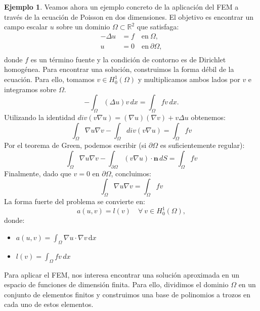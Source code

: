 \documentclass[a4paper,11pt,spanish, twoside, leqno]{tfg-uam}
\theoremstyle{definition}
\newtheorem{exmp}[teor]{Ejemplo}
\begin{document}
\begin{mdframed}  
\begin{exmp}
    Veamos ahora un ejemplo concreto de la aplicación del FEM a través de la ecuación de Poisson en dos dimensiones. El objetivo es encontrar un campo escalar $ u $ sobre un dominio $\Omega \subset \mathbb{R}^2$ que satisfaga:
    \begin{equation}
    \begin{aligned}
    - \Delta u &= f \quad \text{en} \ \Omega, \\
    u &= 0 \quad \text{en} \ \partial\Omega, \\
    \end{aligned}
    \end{equation}
    donde $ f $ es un término fuente y la condición de contorno es de Dirichlet homogénea. Para encontrar una solución, construimos la forma débil de la ecuación. Para ello, tomamos $v\in H_0^1(\Omega)$ y multiplicamos ambos lados por $v$ e integramos sobre $\Omega$.
    \begin{equation*}
        -\int_{\Omega} (\Delta u) v \, dx = \int_{\Omega} f v \, dx.
    \end{equation*}
    Utilizando la identidad $div(v\nabla u) = (\nabla u)(\nabla v) + v \Delta u$ obtenemos:
    \begin{equation*}
    \int_{\Omega} \nabla u \nabla v - \int_{\Omega} div(v \nabla u) = \int_{\Omega} f v
    \end{equation*}
    Por el teorema de Green, podemos escribir (si $\partial \Omega$ es suficientemente regular):
    \begin{equation*}
    \int_{\Omega} \nabla u \nabla v - \int_{\partial \Omega} (v \nabla u) \cdot \mathbf{n} \, dS = \int_{\Omega} f v
    \end{equation*}
    Finalmente, dado que $v = 0$ en $\partial \Omega$, concluimos:
    \begin{equation*}
    \int_{\Omega} \nabla u \nabla v = \int_{\Omega} f v
    \end{equation*}
    La forma fuerte del problema se convierte en: 
    \begin{equation}\label{eq:forma_debil_poisson}
    a(u, v) = l(v) \quad \forall \ v \in H_0^1(\Omega),
    \end{equation}
    donde:
    \begin{itemize}
        \item $ a(u, v) = \int_{\Omega} \nabla u \cdot \nabla v \, \text{d}x $
        \item $ l(v) = \int_{\Omega} f v \, dx $
    \end{itemize}
    Para aplicar el FEM, nos interesa encontrar una solución aproximada en un espacio de funciones de dimensión finita. Para ello, dividimos el dominio $\Omega$ en un conjunto de elementos finitos y construimos una base de polinomios a trozos en cada uno de estos elementos. 
    

\end{exmp}
\end{mdframed}
\end{document}
